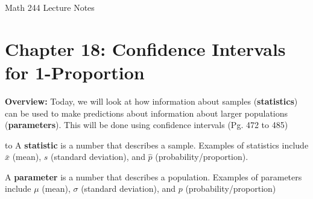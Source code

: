 \documentclass[12pt]{amsart}
\date{}
\theoremstyle{definition}
\begin{document}
\newcommand{\ph}{\phantom}
\newcommand{\ds}{\displaystyle}

\renewcommand{\emph}{\textbf}
\onehalfspace


\fancyhf{}   %
\renewcommand{\headrulewidth}{0.4pt} %
\fancyfootoffset[LE,LO]{0in}        %
\renewcommand{\footrulewidth}{0.4pt} %




\begin{center}

	\larger[3]	Math 244 Lecture Notes \smaller[3]		\\[22pt]

\end{center}

\section*{Chapter 18: Confidence Intervals for 1-Proportion}




 \textbf{Overview:} Today, we will look at how information about samples (\emph{statistics}) can be used to make predictions about information about larger populations (\emph{parameters}). This will be done using confidence intervals (Pg. 472 to 485)\begin{framed}
 to  A \emph{statistic} is a number that describes a sample. Examples of statistics include $\bar{x}$ (mean), $s$ (standard deviation), and $\hat{p}$ (probability/proportion).
 \end{framed}
 
 \begin{framed}
 	A \emph{parameter} is a number that describes a population. Examples of parameters include $\mu$ (mean), $\sigma$ (standard deviation), and $p$ (probability/proportion)
 \end{framed}
\end{document}
